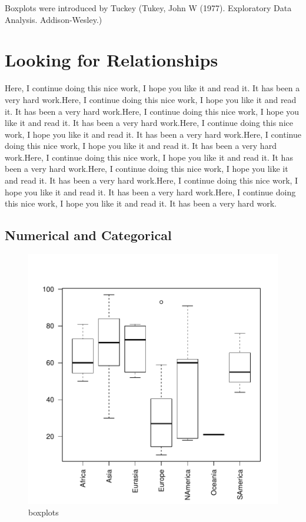 \documentclass[11pt]{article}
\begin{document}
Boxplots were introduced by Tuckey (Tukey, John W (1977). Exploratory Data Analysis. Addison-Wesley.)

\section{Looking for Relationships}\label{bivar}


Here, I continue doing this nice work, I hope you like it and read it. It has been a very hard work.Here, I continue doing this nice work, I hope you like it and read it. It has been a very hard work.Here, I continue doing this nice work, I hope you like it and read it. It has been a very hard work.Here, I continue doing this nice work, I hope you like it and read it. It has been a very hard work.Here, I continue doing this nice work, I hope you like it and read it. It has been a very hard work.Here, I continue doing this nice work, I hope you like it and read it. It has been a very hard work.Here, I continue doing this nice work, I hope you like it and read it. It has been a very hard work.Here, I continue doing this nice work, I hope you like it and read it. It has been a very hard work.Here, I continue doing this nice work, I hope you like it and read it. It has been a very hard work.

\subsection{Numerical and  Categorical}\label{binumcat}


\begin{figure}[h]
\centering                                  %
\begin{adjustbox}{width=7cm,height=7cm,clip,trim=0cm 0cm 0cm 0cm} 
\includegraphics{PaperInR_7-numcat_plot}
\end{adjustbox}
\caption{boxplots}  %
\label{numcat_plot} %
\end{figure}
\end{document}
